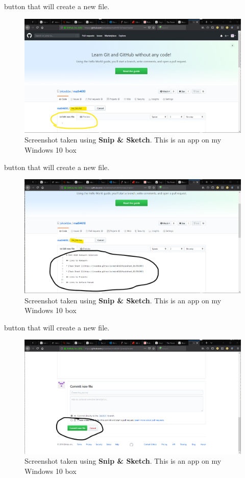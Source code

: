 \documentclass[10pt,fleqn]{article}
\begin{document}
button that will create a new file.
\vfill
\begin{figure}[h]
\centering
\includegraphics{../images/github_05.png}
\caption{{Screenshot} taken using {\bf Snip \& Sketch}. This is an app on
         my Windows 10 box}
\end{figure}
\eject
button that will create a new file.
\vfill
\begin{figure}[h]
\centering
\includegraphics{../images/github_06.png}
\caption{{Screenshot} taken using {\bf Snip \& Sketch}. This is an app on
         my Windows 10 box}
\end{figure}
\eject
button that will create a new file.
\vfill
\begin{figure}[h]
\centering
\includegraphics{../images/github_07.png}
\caption{{Screenshot} taken using {\bf Snip \& Sketch}. This is an app on
         my Windows 10 box}
\end{figure}
\end{document}
